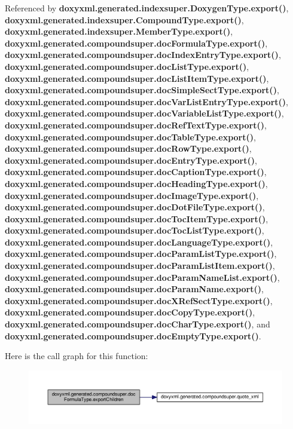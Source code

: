 Referenced by {\bf doxyxml.\+generated.\+indexsuper.\+Doxygen\+Type.\+export()}, {\bf doxyxml.\+generated.\+indexsuper.\+Compound\+Type.\+export()}, {\bf doxyxml.\+generated.\+indexsuper.\+Member\+Type.\+export()}, {\bf doxyxml.\+generated.\+compoundsuper.\+doc\+Formula\+Type.\+export()}, {\bf doxyxml.\+generated.\+compoundsuper.\+doc\+Index\+Entry\+Type.\+export()}, {\bf doxyxml.\+generated.\+compoundsuper.\+doc\+List\+Type.\+export()}, {\bf doxyxml.\+generated.\+compoundsuper.\+doc\+List\+Item\+Type.\+export()}, {\bf doxyxml.\+generated.\+compoundsuper.\+doc\+Simple\+Sect\+Type.\+export()}, {\bf doxyxml.\+generated.\+compoundsuper.\+doc\+Var\+List\+Entry\+Type.\+export()}, {\bf doxyxml.\+generated.\+compoundsuper.\+doc\+Variable\+List\+Type.\+export()}, {\bf doxyxml.\+generated.\+compoundsuper.\+doc\+Ref\+Text\+Type.\+export()}, {\bf doxyxml.\+generated.\+compoundsuper.\+doc\+Table\+Type.\+export()}, {\bf doxyxml.\+generated.\+compoundsuper.\+doc\+Row\+Type.\+export()}, {\bf doxyxml.\+generated.\+compoundsuper.\+doc\+Entry\+Type.\+export()}, {\bf doxyxml.\+generated.\+compoundsuper.\+doc\+Caption\+Type.\+export()}, {\bf doxyxml.\+generated.\+compoundsuper.\+doc\+Heading\+Type.\+export()}, {\bf doxyxml.\+generated.\+compoundsuper.\+doc\+Image\+Type.\+export()}, {\bf doxyxml.\+generated.\+compoundsuper.\+doc\+Dot\+File\+Type.\+export()}, {\bf doxyxml.\+generated.\+compoundsuper.\+doc\+Toc\+Item\+Type.\+export()}, {\bf doxyxml.\+generated.\+compoundsuper.\+doc\+Toc\+List\+Type.\+export()}, {\bf doxyxml.\+generated.\+compoundsuper.\+doc\+Language\+Type.\+export()}, {\bf doxyxml.\+generated.\+compoundsuper.\+doc\+Param\+List\+Type.\+export()}, {\bf doxyxml.\+generated.\+compoundsuper.\+doc\+Param\+List\+Item.\+export()}, {\bf doxyxml.\+generated.\+compoundsuper.\+doc\+Param\+Name\+List.\+export()}, {\bf doxyxml.\+generated.\+compoundsuper.\+doc\+Param\+Name.\+export()}, {\bf doxyxml.\+generated.\+compoundsuper.\+doc\+X\+Ref\+Sect\+Type.\+export()}, {\bf doxyxml.\+generated.\+compoundsuper.\+doc\+Copy\+Type.\+export()}, {\bf doxyxml.\+generated.\+compoundsuper.\+doc\+Char\+Type.\+export()}, and {\bf doxyxml.\+generated.\+compoundsuper.\+doc\+Empty\+Type.\+export()}.



Here is the call graph for this function\+:
\nopagebreak
\begin{figure}[H]
\begin{center}
\leavevmode
\includegraphics[width=350pt]{d5/d88/classdoxyxml_1_1generated_1_1compoundsuper_1_1docFormulaType_aa5434015e3ee09f0f65acbfa9c688aa5_cgraph}
\end{center}
\end{figure}




